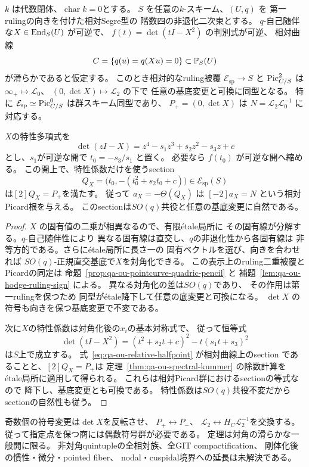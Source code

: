 \begin{corollary}
\label{cor:qa-ou-relative-regular-semisimple-potential}
$k$ は代数閉体、$\operatorname{char}k=0$とする。
$S$ を任意の$k$-スキーム、$(U,q)$ を
第一rulingの向きを付けた相対Segre型の
階数四の非退化二次束とする。
$q$-自己随伴な$X\in\operatorname{End}_S(U)$ が可逆で、
$f(t)=\det(tI-X^2)$ の判別式が可逆、
相対曲線
\[
 C=\{q(u)=q(Xu)=0\}\subset\mathbb P_S(U)
\]
が滑らかであると仮定する。
このとき相対的なruling被覆
$\mathcal E_{\mathrm{sp}}\to S$ と
$\operatorname{Pic}^2_{C/S}$ は
$\infty_+\mapsto\mathcal L_0$、
$(0,\det X)\mapsto\mathcal L_2$ の下で
任意の基底変更と可換に同型となる。
特に $\mathcal E_{\mathrm{sp}}\simeq\operatorname{Pic}^0_{C/S}$
は群スキーム同型であり、
$P_+=(0,\det X)$ は
$N=\mathcal L_2\mathcal L_0^{-1}$ に対応する。

$X$の特性多項式を
\[
 \det(zI-X)=z^4-s_1z^3+s_2z^2-s_3z+c
\]
とし、$s_1$が可逆な開で
$t_0=-s_3/s_1$ と置く。
必要なら $f(t_0)$ が可逆な開へ縮める。
この開上で、特性係数だけを使うsection
\[
 Q_X=\bigl(t_0,-(t_0^2+s_2t_0+c)\bigr)
 \in\mathcal E_{\mathrm{sp}}(S)
 \tag{OU-relative-half}\label{eq:qa-ou-relative-halfpoint}
\]
は$[2]Q_X=P_+$を満たす。
従って $a_X=-\Theta(Q_X)$ は
$[-2]a_X=N$ という相対Picard根を与える。
このsectionは$SO(q)$共役と任意の基底変更に自然である。
\end{corollary}
\begin{proof}
$X$ の固有値の二乗が相異なるので、有限étale局所に
その固有線が分解する。$q$-自己随伴性により
異なる固有線は直交し、$q$の非退化性から各固有線は
非等方的である。さらにétale局所に長さ一の
固有ベクトルを選び、向きを合わせれば
$SO(q)$-正規直交基底で$X$を対角化できる。
この表示上のruling二重被覆とPicardの同定は
命題~\ref{prop:qa-ou-pointcurve-quadric-pencil} と
補題~\ref{lem:qa-ou-hodge-ruling-sign} による。
異なる対角化の差は$SO(q)$であり、
その作用は第一rulingを保つため
同型がétale降下して任意の底変更と可換になる。
$\det X$ の符号も向きを保つ基底変更で不変である。

次に$X$の特性係数は対角化後の$x_i$の基本対称式で、
従って恒等式
\[
 \det(tI-X^2)
   =(t^2+s_2t+c)^2-t(s_1t+s_3)^2
\]
は$S$上で成立する。
式~\eqref{eq:qa-ou-relative-halfpoint} が相対曲線上のsection
であることと、$[2]Q_X=P_+$は
定理~\ref{thm:qa-ou-spectral-kummer} の除数計算を
étale局所に適用して得られる。
これらは相対Picard群におけるsectionの等式なので
降下し、基底変更とも可換である。
特性係数は$SO(q)$共役不変だからsectionの自然性も従う。
\end{proof}

\begin{remark}[偶数符号群と残る比較]
\label{rem:qa-ou-ruling-orientation}
奇数個の符号変更は$\det X$を反転させ、
$P_+\leftrightarrow P_-$、
$\mathcal L_2\leftrightarrow H_C\mathcal L_2^{-1}$を交換する。
従って指定点を保つ商には偶数符号群が必要である。
定理は対角の滑らかな一般開に限る。
非対角quintupleの全相対族、全GIT compactification、
剛体化後の慣性・微分・pointed fiber、
nodal・cuspidal境界への延長は未解決である。
\end{remark}

